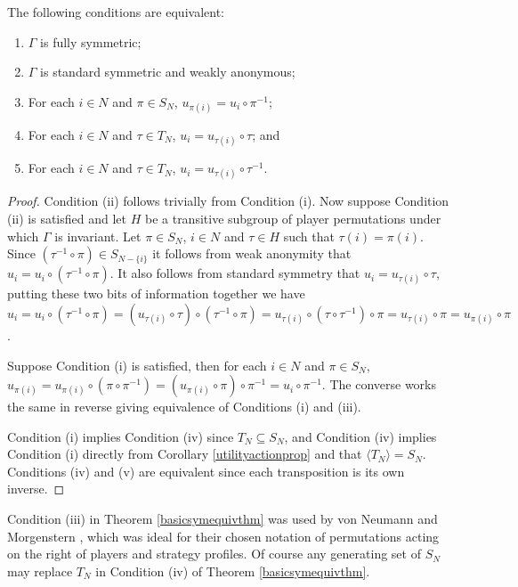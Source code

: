 \begin{theorem} \label{basicsymequivthm}
	The following conditions are equivalent:
	\begin{enumerate}
		\item $\Gamma$ is fully symmetric;
		\item $\Gamma$ is standard symmetric and weakly anonymous;
		\item For each $i \in N$ and $\pi \in S_N$, $u_{\pi(i)} = u_i \circ \pi^{-1}$; 
		\item For each $i \in N$ and $\tau \in T_N$, $u_i = u_{\tau(i)} \circ \tau$; and
		\item For each $i \in N$ and $\tau \in T_N$, $u_i = u_{\tau(i)} \circ \tau^{-1}$.
	\end{enumerate}
	
	\begin{proof}		
		Condition (ii) follows trivially from Condition (i). Now suppose Condition (ii) is satisfied and let $H$ be a transitive subgroup of player permutations under which $\Gamma$ is invariant. Let $\pi \in S_N$, $i \in N$ and $\tau \in H$ such that $\tau(i) = \pi(i)$. Since $(\tau^{-1} \circ \pi) \in S_{N-\{i\}}$ it follows from weak anonymity that $u_i = u_i \circ (\tau^{-1} \circ \pi)$. It also follows from standard symmetry that $u_i = u_{\tau(i)} \circ \tau$, putting these two bits of information together we have $u_i = u_i \circ (\tau^{-1} \circ \pi) = (u_{\tau(i)} \circ \tau) \circ (\tau^{-1} \circ \pi) = u_{\tau(i)} \circ (\tau \circ \tau^{-1}) \circ \pi = u_{\tau(i)} \circ \pi = u_{\pi(i)} \circ \pi$.
	
		Suppose Condition (i) is satisfied, then for each $i \in N$ and $\pi \in S_N$, $u_{\pi(i)} = u_{\pi(i)} \circ (\pi \circ \pi^{-1}) = (u_{\pi(i)} \circ \pi) \circ \pi^{-1} = u_i \circ \pi^{-1}$. The converse works the same in reverse giving equivalence of Conditions (i) and (iii). 
		
		Condition (i) implies Condition (iv) since $T_N \subseteq S_N$, and Condition (iv) implies Condition (i) directly from Corollary \ref{utilityactionprop} and that $\langle{T_N}\rangle = S_N$. Conditions (iv) and (v) are equivalent since each transposition is its own inverse.
	\end{proof}
\end{theorem}

Condition (iii) in Theorem \ref{basicsymequivthm} was used by von Neumann and Morgenstern \cite{VNM}, which was ideal for their chosen notation of permutations acting on the right of players and strategy profiles. Of course any generating set of $S_N$ may replace $T_N$ in Condition (iv) of Theorem \ref{basicsymequivthm}.

